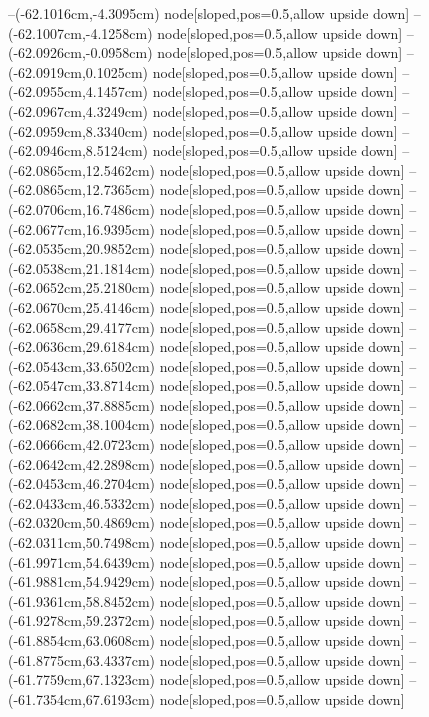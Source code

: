--(-62.1016cm,-4.3095cm) node[sloped,pos=0.5,allow upside down]{\ArrowIn}
--(-62.1007cm,-4.1258cm) node[sloped,pos=0.5,allow upside down]{\arrowIn}
--(-62.0926cm,-0.0958cm) node[sloped,pos=0.5,allow upside down]{\ArrowIn}
--(-62.0919cm,0.1025cm) node[sloped,pos=0.5,allow upside down]{\arrowIn}
--(-62.0955cm,4.1457cm) node[sloped,pos=0.5,allow upside down]{\ArrowIn}
--(-62.0967cm,4.3249cm) node[sloped,pos=0.5,allow upside down]{\arrowIn}
--(-62.0959cm,8.3340cm) node[sloped,pos=0.5,allow upside down]{\ArrowIn}
--(-62.0946cm,8.5124cm) node[sloped,pos=0.5,allow upside down]{\arrowIn}
--(-62.0865cm,12.5462cm) node[sloped,pos=0.5,allow upside down]{\ArrowIn}
--(-62.0865cm,12.7365cm) node[sloped,pos=0.5,allow upside down]{\arrowIn}
--(-62.0706cm,16.7486cm) node[sloped,pos=0.5,allow upside down]{\ArrowIn}
--(-62.0677cm,16.9395cm) node[sloped,pos=0.5,allow upside down]{\arrowIn}
--(-62.0535cm,20.9852cm) node[sloped,pos=0.5,allow upside down]{\ArrowIn}
--(-62.0538cm,21.1814cm) node[sloped,pos=0.5,allow upside down]{\arrowIn}
--(-62.0652cm,25.2180cm) node[sloped,pos=0.5,allow upside down]{\ArrowIn}
--(-62.0670cm,25.4146cm) node[sloped,pos=0.5,allow upside down]{\arrowIn}
--(-62.0658cm,29.4177cm) node[sloped,pos=0.5,allow upside down]{\ArrowIn}
--(-62.0636cm,29.6184cm) node[sloped,pos=0.5,allow upside down]{\arrowIn}
--(-62.0543cm,33.6502cm) node[sloped,pos=0.5,allow upside down]{\ArrowIn}
--(-62.0547cm,33.8714cm) node[sloped,pos=0.5,allow upside down]{\arrowIn}
--(-62.0662cm,37.8885cm) node[sloped,pos=0.5,allow upside down]{\ArrowIn}
--(-62.0682cm,38.1004cm) node[sloped,pos=0.5,allow upside down]{\arrowIn}
--(-62.0666cm,42.0723cm) node[sloped,pos=0.5,allow upside down]{\ArrowIn}
--(-62.0642cm,42.2898cm) node[sloped,pos=0.5,allow upside down]{\arrowIn}
--(-62.0453cm,46.2704cm) node[sloped,pos=0.5,allow upside down]{\ArrowIn}
--(-62.0433cm,46.5332cm) node[sloped,pos=0.5,allow upside down]{\arrowIn}
--(-62.0320cm,50.4869cm) node[sloped,pos=0.5,allow upside down]{\ArrowIn}
--(-62.0311cm,50.7498cm) node[sloped,pos=0.5,allow upside down]{\arrowIn}
--(-61.9971cm,54.6439cm) node[sloped,pos=0.5,allow upside down]{\ArrowIn}
--(-61.9881cm,54.9429cm) node[sloped,pos=0.5,allow upside down]{\arrowIn}
--(-61.9361cm,58.8452cm) node[sloped,pos=0.5,allow upside down]{\ArrowIn}
--(-61.9278cm,59.2372cm) node[sloped,pos=0.5,allow upside down]{\arrowIn}
--(-61.8854cm,63.0608cm) node[sloped,pos=0.5,allow upside down]{\ArrowIn}
--(-61.8775cm,63.4337cm) node[sloped,pos=0.5,allow upside down]{\arrowIn}
--(-61.7759cm,67.1323cm) node[sloped,pos=0.5,allow upside down]{\ArrowIn}
--(-61.7354cm,67.6193cm) node[sloped,pos=0.5,allow upside down]{\arrowIn}

